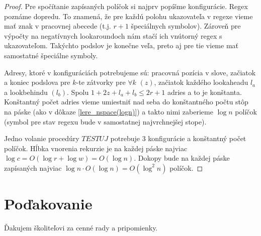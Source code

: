 \documentclass{svk_long_sk}
\begin{document}
\begin{proof}
Pre spočítanie zapísaných políčok si najprv popíšme konfigurácie. Regex poznáme dopredu. To znamená, že pre každú polohu ukazovateľa v regexe vieme mať znak v pracovnej abecede (t.j. $r+1$ špeciálnych symbolov). Zároveň pre výpočty na negatívnych lookaroundoch nám stačí ich vnútorný regex s ukazovateľom. Takýchto podslov je konečne veľa, preto aj pre tie vieme mať samostatné špeciálne symboly. 

Adresy, ktoré v konfiguráciách potrebujeme sú: pracovná pozícia v slove, začiatok a koniec podslova pre $k$-te zátvorky pre $\forall k$ $(z)$, začiatok každého lookaheadu $l_a$ a lookbehindu $(l_b)$. Spolu $1+2z+l_a+l_b \leq 2r+1$ adries a to je konštanta. Konštantný počet adries vieme umiestniť nad seba do konštantného počtu stôp na páske (ako v dôkaze \ref{lere_nspace(logn)}) a takto nimi zaberieme $\log n$ políčok (symbol pre stav regexu bude v samostatnej najvrchnejšej stope).

Jedno volanie procedúry $TESTUJ$ potrebuje 3 konfigurácie a konštantný počet políčok. Hĺbka vnorenia rekurzie je na každej páske najviac $\log c=O(\log r + \log w) = O(\log n)$. Dokopy bude na každej páske zapísaných najviac $\log n \cdot O(\log n) = O(\log^2n)$ políčok.
\end{proof}


\section*{Poďakovanie}
Ďakujem školiteľovi za cenné rady a pripomienky.


\nocite{*}


\end{document}
